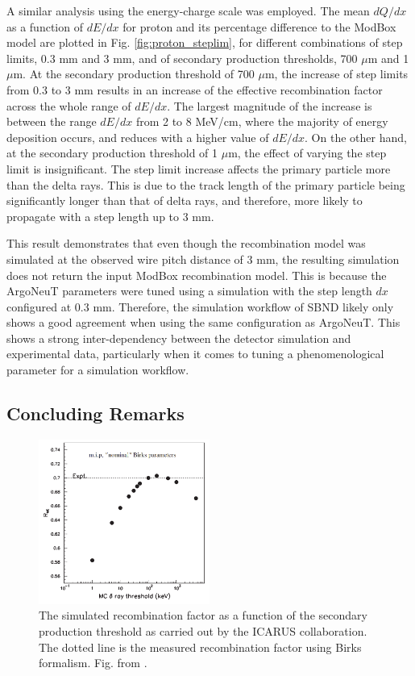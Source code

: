 A similar analysis using the energy-charge scale was employed.
The mean $dQ/dx$ as a function of $dE/dx$ for proton and its percentage difference to the ModBox model are plotted in Fig. \ref{fig:proton_steplim}, for different combinations of step limits, 0.3 mm and 3 mm, and of secondary production thresholds, 700 $\mu$m and 1 $\mu$m.
At the secondary production threshold of 700 $\mu$m, the increase of step limits from 0.3 to 3 mm results in an increase of the effective recombination factor across the whole range of $dE/dx$.
The largest magnitude of the increase is between the range $dE/dx$ from 2 to 8 MeV/cm, where the majority of energy deposition occurs, and reduces with a higher value of $dE/dx$. 
On the other hand, at the secondary production threshold of 1 $\mu$m, the effect of varying the step limit is insignificant.
The step limit increase affects the primary particle more than the delta rays.
This is due to the track length of the primary particle being significantly longer than that of delta rays, and therefore, more likely to propagate with a step length up to 3 mm.

This result demonstrates that even though the recombination model was simulated at the observed wire pitch distance of 3 mm, the resulting simulation does not return the input ModBox recombination model.
This is because the ArgoNeuT parameters were tuned using a simulation with the step length $dx$ configured at 0.3 mm.
Therefore, the simulation workflow of SBND likely only shows a good agreement when using the same configuration as ArgoNeuT.
This shows a strong inter-dependency between the detector simulation and experimental data, particularly when it comes to tuning a phenomenological parameter for a simulation workflow.

\subsection{Concluding Remarks}

\label{sec:concludeDeltaRay}

\begin{figure}[bp!]
\centering 
\includegraphics[width=0.5\textwidth]{icarus_recomb}
\caption{
The simulated recombination factor as a function of the secondary production threshold as carried out by the ICARUS collaboration.
The dotted line is the measured recombination factor using Birks formalism. 
Fig. from \cite{icarus_recomb}.
}
\label{fig:icarus_recomb}
\end{figure}

